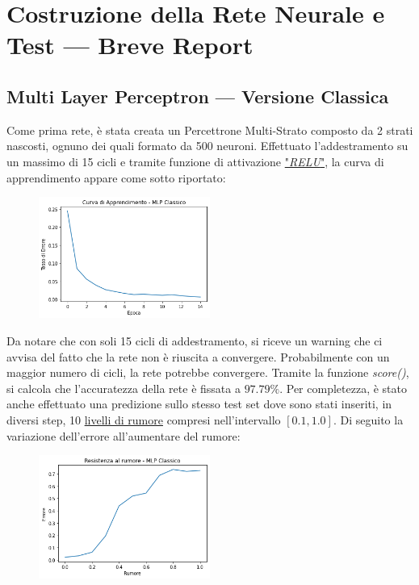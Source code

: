 \documentclass[12pt, a4paper]{article}
\begin{document}
\newpage
\section{Costruzione della Rete Neurale e Test --- Breve Report}
\subsection{Multi Layer Perceptron --- Versione Classica}
Come prima rete, è stata creata un Percettrone Multi-Strato composto da 2 strati nascosti, ognuno dei quali formato da 500 neuroni. Effettuato l'addestramento su un massimo di 15 cicli e tramite funzione di attivazione \href{https://it.wikipedia.org/wiki/Rettificatore_(reti_neurali)}{"\textit{RELU}"}, la curva di apprendimento appare come sotto riportato:
\begin{figure}[H]
    \centering
    \includegraphics[width=0.50\textwidth]{Curva_MLP}
\end{figure}
Da notare che con soli 15 cicli di addestramento, si riceve un warning che ci avvisa del fatto che la rete non è riuscita a convergere. Probabilmente con un maggior numero di cicli, la rete potrebbe convergere.
Tramite la funzione \textit{score()}, si calcola che l'accuratezza della rete è fissata a \(97.79\%\).
Per completezza, è stato anche effettuato una predizione sullo stesso test set dove sono stati inseriti, in diversi step, 10 \href{https://it.wikipedia.org/wiki/Rumore_gaussiano}{livelli di rumore} compresi nell'intervallo \([0.1 , 1.0]\). Di seguito la variazione dell'errore all'aumentare del rumore:
\begin{figure}[H]
    \centering
    \includegraphics[width=0.50\textwidth]{Rumore_MLP.png}
\end{figure}
\end{document}
